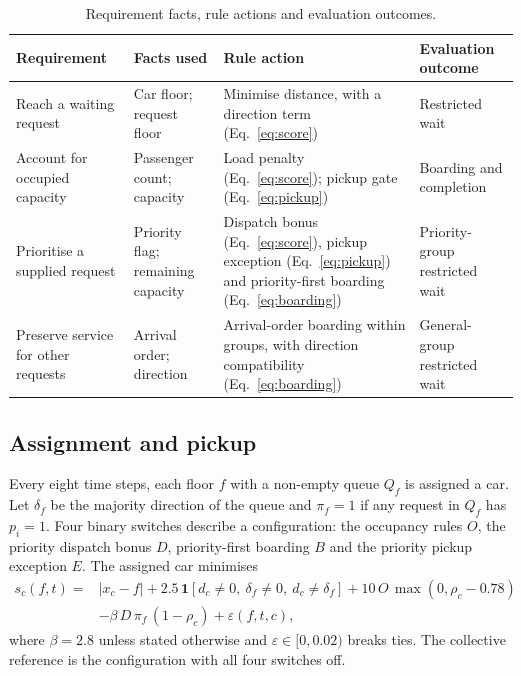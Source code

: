 \begin{table}[H]\centering
\caption{Requirement facts, rule actions and evaluation outcomes.}\label{tab:rules}
\small\begin{tabular}{@{}p{.22\linewidth}p{.21\linewidth}p{.30\linewidth}p{.19\linewidth}@{}}
\toprule Requirement & Facts used & Rule action & Evaluation outcome\\\midrule
Reach a waiting request & Car floor; request floor & Minimise distance, with a direction term (Eq.~\eqref{eq:score}) & Restricted wait\\
Account for occupied capacity & Passenger count; capacity & Load penalty (Eq.~\eqref{eq:score}); pickup gate (Eq.~\eqref{eq:pickup}) & Boarding and completion\\
Prioritise a supplied request & Priority flag; remaining capacity & Dispatch bonus (Eq.~\eqref{eq:score}), pickup exception (Eq.~\eqref{eq:pickup}) and priority-first boarding (Eq.~\eqref{eq:boarding}) & Priority-group restricted wait\\
Preserve service for other requests & Arrival order; direction & Arrival-order boarding within groups, with direction compatibility (Eq.~\eqref{eq:boarding}) & General-group restricted wait\\
\bottomrule
\end{tabular}
\end{table}

\subsection{Assignment and pickup}\label{assignment-and-pickup}

Every eight time steps, each floor $f$ with a non-empty queue $Q_f$ is assigned a car. Let $\delta_f$ be the majority direction of the queue and $\pi_f=1$ if any request in $Q_f$ has $p_i=1$. Four binary switches describe a configuration: the occupancy rules $O$, the priority dispatch bonus $D$, priority-first boarding $B$ and the priority pickup exception $E$. The assigned car minimises
\begin{equation}
\begin{split}
s_c(f,t) ={}& |x_c-f| + 2.5\,\mathbf{1}[d_c\neq 0,\ \delta_f\neq 0,\ d_c\neq\delta_f] + 10\,O\,\max(0,\rho_c-0.78)\\
&- \beta\,D\,\pi_f\,(1-\rho_c) + \varepsilon(f,t,c),
\end{split}
\label{eq:score}
\end{equation}
where $\beta=2.8$ unless stated otherwise and $\varepsilon\in[0,0.02)$ breaks ties. The collective reference is the configuration with all four switches off.

